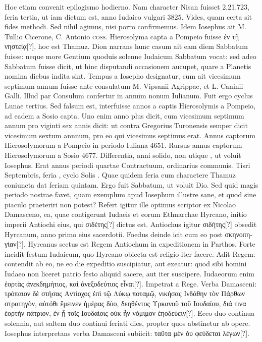 Hoc etiam
convenit epilogismo hodierno.
Nam character Nisan fuisset 2,21.723,
feria tertia, ut iam dictum est, anno Iudaico vulgari 3825.
Vides,
quam certa sit fides methodi.
Sed nihil agimus, nisi porro confirmemus.
Idem Iosephus ait M. Tullio Cicerone, C. Antonio \textsc{coss}.
Hierosolyma capta a Pompeio fuisse \textgreek{ἐν τῇ νηστείᾳ[?]},
 hoc est  Thamuz.
Dion narrans hunc casum ait eam diem Sabbatum fuisse:
neque more Gentium quoduis solenne Iudaicum Sabbatum vocat:
sed adeo Sabbatum fuisse dicit, ut hinc disputandi occasionem aucupet,
quare a Planetis nomina diebus indita sint.
Tempus a Iosepho
designatur, cum ait vicesimum septimum annum fuisse ante consulatum
M. Vipsanii Agrippae, et L. Caninii Galli.
Illud par Consulum
confertur in annum nonum Iulianum.
Fuit ergo cyclus Lunae
tertius.
Sed falsum est, interfuisse  annos a captis Hierosolymis
a Pompeio, ad eadem a Sosio capta.
Uno enim anno plus dicit,
cum vicesimum septimum annum pro viginti sex annis dicit: ut contra
Gregorius Turonensis semper dicit vicesimum sextum annnum,
pro eo qui vicesimus septimus erat.
Annus captorum Hierosolymorum
a Pompeio in periodo Iuliana 4651.
Rursus annus captorum
Hierosolymorum a Sosio 4677.
Differentia, anni  solido, non
utique , ut voluit Iosephus.
Erat annus  periodi quartae
Contractuum, ordinarius communis.
Tisri  Septembris, feria
, cyclo Solis .
Quae quidem feria cum charactere Thamuz coniuncta
dat feriam quintam.
Ergo  fuit Sabbatum, ut voluit Dio.
Sed quid
magis periodo nostrae favet, quam exemplum apud Iosephum illustre
sane, et quod sine piaculo praeteriri non potest?
Refert igitur ille optimus
scriptor ex Nicolao Damasceno, ea, quae contigerunt Iudaeis et
eorum Ethnarchae Hyrcano, initio imperii Antiochi eius,
 qui \textgreek{σιδέτης[?]}
dictus est.
Antiochus igitur \textgreek{σιδήτης[?]} obsedit Hyrcanum, anno primo
eius sacerdotii.
Foedus deinde icit cum eo post \textgreek{σκηνοπηγίαν[?]}.
Hyrcanus
sectus est Regem Antiochum in expeditionem in Parthos.
Forte incidit
festum Iudaicum, quo Hyrcano obiecta est religio iter facere.
Adit Regem: contendit ab eo,
 ne eo die expeditio suscipiatur, aut exeatur:
quod sibi homini Iudaeo non liceret patrio festo aliquid sacere, aut
iter suscipere.
Iudaeorum enim \textgreek{ἑορτὰς ἀνεκδημήτιος, καὶ ἀνεξοδεύτιος εἶναι[?]}.
Impetrat a Rege.
Verba Damasceni: \textgreek{τρόπαιον δὲ στήσας Αντίοχος ἐπὶ τῷ
Λύκῳ ποταμῷ, νικήσας Ινδάθην τὸν Πάρθων στρατηγὸν, αὐτόθι ἔμεινεν ἡμέρας
δύο, δεηθέντος Υρκανοῦ τοῦ Ιουδαίου, διά τινα ἑορτὴν πάτριον, ἐν ᾗ τοῖς Ιουδαίοις
οὐκ ἦν νόμιμον ἐηοδεύειν[?]}.
Ecco duo continua solennia, aut saltem duo
continui feriati dies, propter quos abstinetur ab opere.
Iosephus interpretans
verba Damasceni subiicit: \textgreek{ταῦτα μὲν ὀυ φεύδεται λέγων[?]}.

